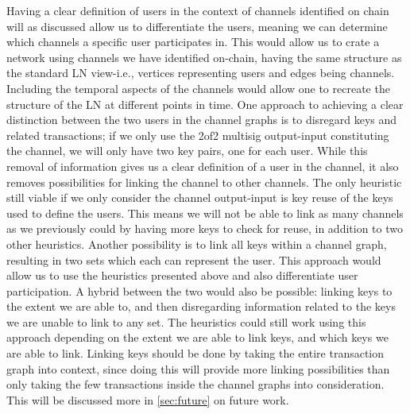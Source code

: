 Having a clear definition of users in the context of channels identified on chain will as discussed allow us to differentiate the users, meaning we can determine which channels a specific user participates in. This would allow us to crate a network using channels we have identified on-chain, having the same structure as the standard LN view-i.e., vertices representing users and edges being channels. Including the temporal aspects of the channels would allow one to recreate the structure of the LN at different points in time. 
One approach to achieving a clear distinction between the two users in the channel graphs is to disregard keys and related transactions; if we only use the 2of2 multisig output-input constituting the channel, we will only have two key pairs, one for each user. While this removal of information gives us a clear definition of a user in the channel, it also removes possibilities for linking the channel to other channels. The only heuristic still viable if we only consider the channel output-input is key reuse of the keys used to define the users. This means we will not be able to link as many channels as we previously could by having more keys to check for reuse, in addition to two other heuristics. Another possibility is to link all keys within a channel graph, resulting in two sets which each can represent the user. This approach would allow us to use the heuristics presented above and also differentiate user participation. A hybrid between the two would also be possible: linking keys to the extent we are able to, and then disregarding information related to the keys we are unable to link to any set. The heuristics could still work using this approach depending on the extent we are able to link keys, and which keys we are able to link. Linking keys should be done by taking the entire transaction graph into context, since doing this will provide more linking possibilities than only taking the few transactions inside the channel graphs into consideration. This will be discussed more in \cref{sec:future} on future work.










